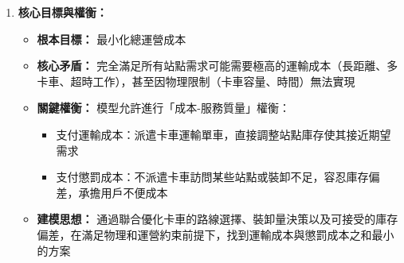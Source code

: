 \begin{enumerate}
    \item \textbf{核心目標與權衡：}
    \begin{itemize}
        \item \textbf{根本目標：} 最小化總運營成本
        \item \textbf{核心矛盾：} 完全滿足所有站點需求可能需要極高的運輸成本（長距離、多卡車、超時工作），甚至因物理限制（卡車容量、時間）無法實現
        \item \textbf{關鍵權衡：} 模型允許進行「成本-服務質量」權衡：
        \begin{itemize}
            \item 支付運輸成本：派遣卡車運輸單車，直接調整站點庫存使其接近期望需求
            \item 支付懲罰成本：不派遣卡車訪問某些站點或裝卸不足，容忍庫存偏差，承擔用戶不便成本
        \end{itemize}
        \item \textbf{建模思想：} 通過聯合優化卡車的路線選擇、裝卸量決策以及可接受的庫存偏差，在滿足物理和運營約束前提下，找到運輸成本與懲罰成本之和最小的方案
    \end{itemize}


\end{enumerate}

